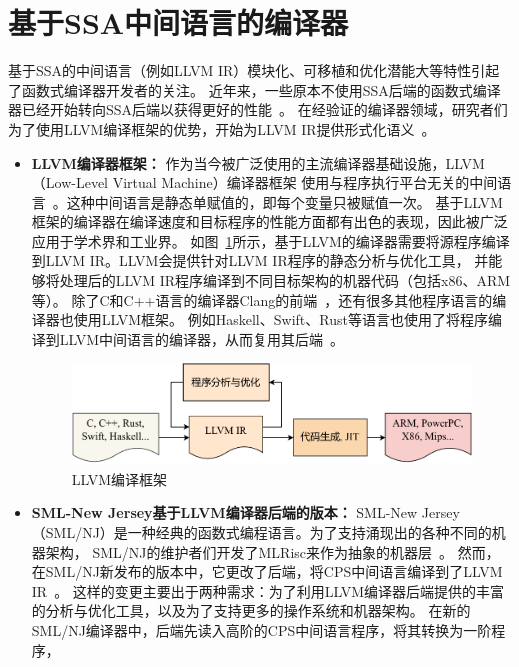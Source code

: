 \section{基于SSA中间语言的编译器} \label{sec:relatedssa}

基于SSA的中间语言（例如LLVM IR）模块化、可移植和优化潜能大等特性引起了函数式编译器开发者的关注。
近年来，一些原本不使用SSA后端的函数式编译器已经开始转向SSA后端以获得更好的性能~\cite{farvardin2020new}。
在经验证的编译器领域，研究者们为了使用LLVM编译框架的优势，开始为LLVM IR提供形式化语义~\cite{zhao2012formalizing}。

\begin{itemize}
    \item \textbf{LLVM编译器框架：} 
    作为当今被广泛使用的主流编译器基础设施，LLVM（Low-Level Virtual Machine）编译器框架
    使用与程序执行平台无关的中间语言~\cite{lattner2004llvm}。这种中间语言是静态单赋值的，即每个变量只被赋值一次。
    基于LLVM框架的编译器在编译速度和目标程序的性能方面都有出色的表现，因此被广泛应用于学术界和工业界。
    如图~\ref{fig:llvm}所示，基于LLVM的编译器需要将源程序编译到LLVM IR。LLVM会提供针对LLVM IR程序的静态分析与优化工具，
    并能够将处理后的LLVM IR程序编译到不同目标架构的机器代码（包括x86、ARM等）。
    除了C和C++语言的编译器Clang的前端~\cite{lattner2008llvm}，还有很多其他程序语言的编译器也使用LLVM框架。
    例如Haskell、Swift、Rust等语言也使用了将程序编译到LLVM中间语言的编译器，从而复用其后端~\cite{liu2013intel,zhang2012swift}。
    \begin{figure}[htbp]
        \centering
        \includegraphics[width=0.8\linewidth]{figures/llvmst.pdf}
        \caption{LLVM编译框架}\label{fig:llvm}
    \end{figure}
    \item \textbf{SML-New Jersey基于LLVM编译器后端的版本：} 
    SML-New Jersey（SML/NJ）是一种经典的函数式编程语言。为了支持涌现出的各种不同的机器架构，
    SML/NJ的维护者们开发了MLRisc来作为抽象的机器层~\cite{george1994portable}。
    然而，在SML/NJ新发布的版本中，它更改了后端，将CPS中间语言编译到了LLVM IR~\cite{farvardin2020new}。
    这样的变更主要出于两种需求：为了利用LLVM编译器后端提供的丰富的分析与优化工具，以及为了支持更多的操作系统和机器架构。
    在新的SML/NJ编译器中，后端先读入高阶的CPS中间语言程序，将其转换为一阶程序，

\end{itemize}
